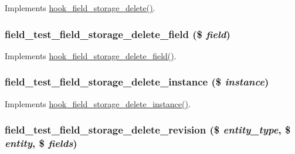 \label{field__test_8storage_8inc_a724f6b8c3ae75b4e9ace35cbe8981e83}
Implements \hyperlink{group__field__storage_ga64bd5adc0e4ccc1fe52fbaabcfa10274}{hook\_\-field\_\-storage\_\-delete()}. \hypertarget{field__test_8storage_8inc_a3f9bebc0bc8a81e2a751383cc7d40e32}{
\subsubsection[{field\_\-test\_\-field\_\-storage\_\-delete\_\-field}]{\setlength{\rightskip}{0pt plus 5cm}field\_\-test\_\-field\_\-storage\_\-delete\_\-field (\$ {\em field})}}
\label{field__test_8storage_8inc_a3f9bebc0bc8a81e2a751383cc7d40e32}
Implements \hyperlink{group__field__storage_ga2102841b167285acf3f0e4e9f854440d}{hook\_\-field\_\-storage\_\-delete\_\-field()}. \hypertarget{field__test_8storage_8inc_a27f07a8c8348e9818bb59b29f1c3f6a0}{
\subsubsection[{field\_\-test\_\-field\_\-storage\_\-delete\_\-instance}]{\setlength{\rightskip}{0pt plus 5cm}field\_\-test\_\-field\_\-storage\_\-delete\_\-instance (\$ {\em instance})}}
\label{field__test_8storage_8inc_a27f07a8c8348e9818bb59b29f1c3f6a0}
Implements \hyperlink{group__field__storage_ga509e10cbd2900c13ab7269f1740a36f7}{hook\_\-field\_\-storage\_\-delete\_\-instance()}. \hypertarget{field__test_8storage_8inc_a2bbfdc99551c6d326bb28324a88a0ffc}{
\subsubsection[{field\_\-test\_\-field\_\-storage\_\-delete\_\-revision}]{\setlength{\rightskip}{0pt plus 5cm}field\_\-test\_\-field\_\-storage\_\-delete\_\-revision (\$ {\em entity\_\-type}, \/  \$ {\em entity}, \/  \$ {\em fields})}}

